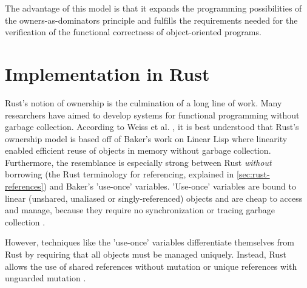 \documentclass[sigplan,11pt,nonacm]{acmart}
\begin{document}
The advantage of this model is that it expands the programming possibilities of the owners-as-dominators principle and fulfills the requirements needed for the verification of the functional correctness of object-oriented programs. \cite{ownership-types-survey}






\section{Implementation in Rust}
\label{sec:implementation-in-rust}

Rust's notion of ownership is the culmination of a long line of work.
Many researchers have aimed to develop systems for functional programming without garbage collection.
According to Weiss et al. \cite{oxide}, it is best understood that Rust's ownership model is based off of Baker's work on Linear Lisp \cite{linear-lisp} where linearity enabled efficient reuse of objects in memory without garbage collection.
Furthermore, the resemblance is especially strong between Rust \emph{without} borrowing (the Rust terminology for referencing, explained in \ref{sec:rust-references}) and Baker's 'use-once' variables.
'Use-once' variables are bound to linear (unshared, unaliased or singly-referenced) objects and are cheap to access and manage, because they require no synchronization or tracing garbage collection \cite{use-once}.

However, techniques like the 'use-once' variables differentiate themselves from Rust by requiring that all objects must be managed uniquely.
Instead, Rust allows the use of shared references without mutation or unique references with unguarded mutation \cite{oxide}.
\end{document}
